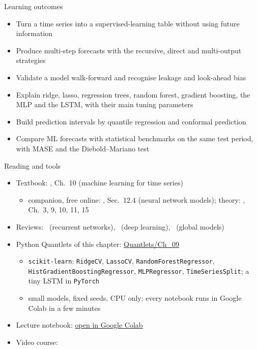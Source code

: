 \begin{frame}{Learning outcomes}
\itemsize{\small}
\begin{itemize}
    \item Turn a time series into a supervised-learning table without using future information
    \item Produce multi-step forecasts with the recursive, direct and multi-output strategies
    \item Validate a model walk-forward and recognise leakage and look-ahead bias
    \item Explain ridge, lasso, regression trees, random forest, gradient boosting, the MLP and the LSTM, with their main tuning parameters
    \item Build prediction intervals by quantile regression and conformal prediction
    \item Compare ML forecasts with statistical benchmarks on the same test period, with MASE and the Diebold--Mariano test
\end{itemize}
\end{frame}

\begin{frame}{Reading and tools}
\itemsize{\small}
\begin{itemize}
    \item Textbook: , Ch.~10 (machine learning for time series)
    \begin{itemize}
        \item companion, free online: , Sec.~12.4 (neural network models); theory: , Ch.~3, 9, 10, 11, 15
    \end{itemize}
    \item Reviews: \ (recurrent networks), \ (deep learning), \ (global models)
    \item Python Quantlets of this chapter: \href{https://github.com/danpele/Time-Series-Analysis/tree/main/Quantlets/Ch_09}{Quantlets/Ch\_09}
    \begin{itemize}
        \item \texttt{scikit-learn}: \texttt{RidgeCV}, \texttt{LassoCV}, \texttt{RandomForestRegressor}, \texttt{HistGradientBoostingRegressor}, \texttt{MLPRegressor}, \texttt{TimeSeriesSplit}; a tiny LSTM in \texttt{PyTorch}
        \item small models, fixed seeds, CPU only: every notebook runs in Google Colab in a few minutes
    \end{itemize}
    \item Lecture notebook: \href{\colaburl{notebooks/EN/chapter9_lecture_notebook.ipynb}}{open in Google Colab}
    \item Video course: 
\end{itemize}
\end{frame}


